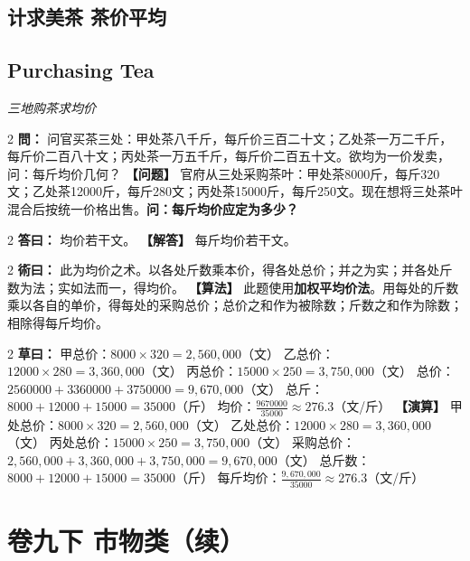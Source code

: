 \documentclass[11pt,a4paper]{article}
\newcommand{\bilingualProblem}[2]{%
  \vspace{0.6em}%
  \begin{paracol}{2}%
  \noindent\textcolor{problemcolor}{\textbf{問：}}#1%
  \switchcolumn%
  \noindent\textcolor{problemcolor}{\textbf{【问题】}}#2%
  \end{paracol}%
  \vspace{0.3em}%
}
\newcommand{\bilingualAnswer}[2]{%
  \begin{paracol}{2}%
  \noindent\textcolor{answercolor}{\textbf{答曰：}}#1%
  \switchcolumn%
  \noindent\textcolor{answercolor}{\textbf{【解答】}}#2%
  \end{paracol}%
  \vspace{0.3em}%
}
\newcommand{\bilingualMethod}[2]{%
  \begin{paracol}{2}%
  \noindent\textcolor{methodcolor}{\textbf{術曰：}}#1%
  \switchcolumn%
  \noindent\textcolor{methodcolor}{\textbf{【算法】}}#2%
  \end{paracol}%
  \vspace{0.3em}%
}
\newcommand{\bilingualWorking}[2]{%
  \begin{paracol}{2}%
  \noindent\textcolor{workingcolor}{\textbf{草曰：}}#1%
  \switchcolumn%
  \noindent\textcolor{workingcolor}{\textbf{【演算】}}#2%
  \end{paracol}%
  \vspace{0.3em}%
}
\newcommand{\bilingualSubsection}[2]{%
  \subsection{#1}
  \begin{center}
  {\small\color{sectioncolor}\textit{#2}}
  \end{center}
  \vspace{0.3em}
}
\begin{document}
\subsection{计求美茶 \quad 茶价平均}
\bilingualSubsection{Purchasing Tea}{三地购茶求均价}

\bilingualProblem{%
问官买茶三处：甲处茶八千斤，每斤价三百二十文；乙处茶一万二千斤，每斤价二百八十文；丙处茶一万五千斤，每斤价二百五十文。欲均为一价发卖，问：每斤均价几何？%
}{%
官府从三处采购茶叶：甲处茶8000斤，每斤320文；乙处茶12000斤，每斤280文；丙处茶15000斤，每斤250文。现在想将三处茶叶混合后按统一价格出售。\textbf{问：每斤均价应定为多少？}%
}

\bilingualAnswer{%
均价若干文。%
}{%
每斤均价若干文。%
}

\bilingualMethod{%
此为均价之术。以各处斤数乘本价，得各处总价；并之为实；并各处斤数为法；实如法而一，得均价。%
}{%
此题使用\textbf{加权平均价法}。用每处的斤数乘以各自的单价，得每处的采购总价；总价之和作为被除数；斤数之和作为除数；相除得每斤均价。%
}

\bilingualWorking{%
甲总价：$8000 \times 320 = 2{,}560{,}000$（文）
乙总价：$12000 \times 280 = 3{,}360{,}000$（文）
丙总价：$15000 \times 250 = 3{,}750{,}000$（文）
总价：$2560000 + 3360000 + 3750000 = 9{,}670{,}000$（文）
总斤：$8000 + 12000 + 15000 = 35000$（斤）
均价：$\displaystyle\frac{9670000}{35000} \approx 276.3$（文/斤）%
}{%
甲处总价：$8000 \times 320 = 2{,}560{,}000$（文）
乙处总价：$12000 \times 280 = 3{,}360{,}000$（文）
丙处总价：$15000 \times 250 = 3{,}750{,}000$（文）
采购总价：$2{,}560{,}000 + 3{,}360{,}000 + 3{,}750{,}000 = 9{,}670{,}000$（文）
总斤数：$8000 + 12000 + 15000 = 35000$（斤）
每斤均价：$\displaystyle\frac{9{,}670{,}000}{35000} \approx 276.3$（文/斤）%
}

\newpage

\section{卷九下 \quad 市物类（续）}
\label{sec:fasc9b}

\begin{center}
\end{center}
\end{document}
